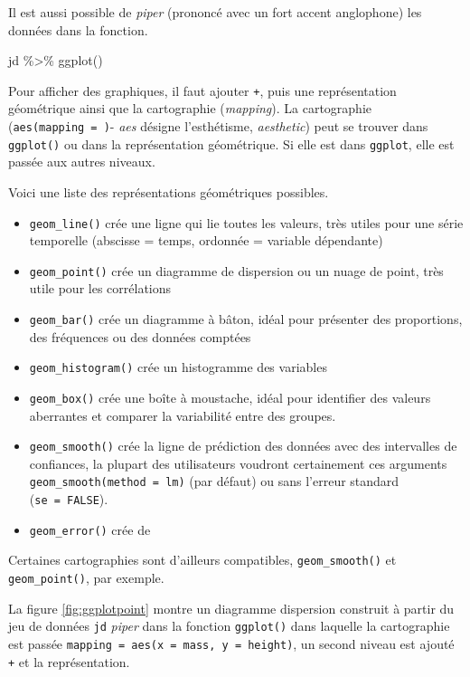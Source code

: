 \documentclass[
]{book}
\newenvironment{Shaded}{}{}
\newcommand{\FunctionTok}[1]{#1}
\newcommand{\NormalTok}[1]{#1}
\newcommand{\SpecialCharTok}[1]{#1}
\begin{document}
Il est aussi possible de \emph{piper} (prononcé avec un fort accent anglophone) les données dans la fonction.

\begin{Shaded}
\begin{Highlighting}[]
\NormalTok{jd }\SpecialCharTok{\%\textgreater{}\%} 
  \FunctionTok{ggplot}\NormalTok{()}
\end{Highlighting}
\end{Shaded}

Pour afficher des graphiques, il faut ajouter \texttt{+}, puis une représentation géométrique ainsi que la cartographie (\emph{mapping}). La cartographie (\texttt{aes(mapping\ =\ )}- \emph{aes} désigne l'esthétisme, \emph{aesthetic}) peut se trouver dans \texttt{ggplot()} ou dans la représentation géométrique. Si elle est dans \texttt{ggplot}, elle est passée aux autres niveaux.

Voici une liste des représentations géométriques possibles.

\begin{itemize}
\item
  \texttt{geom\_line()} crée une ligne qui lie toutes les valeurs, très utiles pour une série temporelle (abscisse = temps, ordonnée = variable dépendante)
\item
  \texttt{geom\_point()} crée un diagramme de dispersion ou un nuage de point, très utile pour les corrélations
\item
  \texttt{geom\_bar()} crée un diagramme à bâton, idéal pour présenter des proportions, des fréquences ou des données comptées
\item
  \texttt{geom\_histogram()} crée un histogramme des variables
\item
  \texttt{geom\_box()} crée une boîte à moustache, idéal pour identifier des valeurs aberrantes et comparer la variabilité entre des groupes.
\item
  \texttt{geom\_smooth()} crée la ligne de prédiction des données avec des intervalles de confiances, la plupart des utilisateurs voudront certainement ces arguments \texttt{geom\_smooth(method\ =\ lm)} (par défaut) ou sans l'erreur standard (\texttt{se\ =\ FALSE}).
\item
  \texttt{geom\_error()} crée de
\end{itemize}

Certaines cartographies sont d'ailleurs compatibles, \texttt{geom\_smooth()} et \texttt{geom\_point()}, par exemple.

La figure \ref{fig:ggplotpoint} montre un diagramme dispersion construit à partir du jeu de données \texttt{jd} \emph{piper} dans la fonction \texttt{ggplot()} dans laquelle la cartographie est passée \texttt{mapping\ =\ aes(x\ =\ mass,\ y\ =\ height)}, un second niveau est ajouté \texttt{+} et la représentation.
\end{document}
